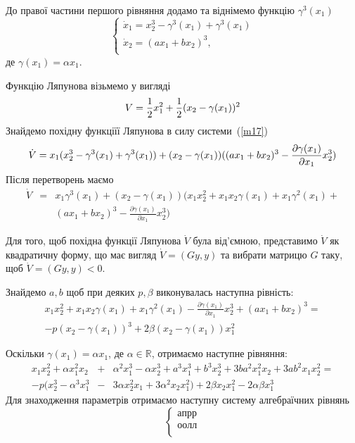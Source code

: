 \documentclass{article}
\begin{document}
До правої частини першого рівняння додамо та віднімемо функцію $\gamma^3(x_1)$ 
\begin{equation} \label{m17}
    \begin{cases}
    \dot x_1 =x_{2}^3 -\gamma^3(x_1)+\gamma^3(x_1) \\
    \dot x_2 = (ax_1+bx_2)^3,\\
    \end{cases}
\end{equation}
де $\gamma(x_1) = \alpha x_1$.

Функцію Ляпунова візьмемо у вигляді  
\begin{equation}
    V = \frac{1}{2}x_{1}^2 +\frac{1}{2}(x_2 - \gamma(x_1) )^2\\
\end{equation}
Знайдемо похідну функціїї Ляпунова в силу системи~(\ref{m17})
\begin{equation}
    \dot V = x_1(x_2^3 - \gamma^3(x_1)+\gamma^3(x_1)) + \\
    (x_2 - \gamma(x_1))( (ax_1+bx_2)^3-\frac{\partial \gamma(x_1)}{\partial x_1}x_2^3)
\end{equation}
Після перетворень маємо
\begin{eqnarray}
    \dot V&=& x_1\gamma^3(x_1)+(x_2 - \gamma(x_1))
   \Big (x_1x_2^2 + x_1x_2\gamma(x_1) + x_{1}\gamma^2(x_1) +\nonumber\\ 
    &&(ax_1+bx_2)^3 - \frac{\partial \gamma(x_1)}{\partial x_1}x_{2}^3\Big)
\end{eqnarray}

Для того, щоб похідна функції Ляпунова $\dot V$ була від'ємною, представимо
 $\dot V$ як квадратичну форму, що має вигляд $\dot V =(Gy,y)$ 
та вибрати матрицю $G$ таку, щоб  $\dot V =(Gy,y) < 0$.

Знайдемо $a,b$ щоб при деяких $p, \beta$ виконувалась наступна рівність:
\begin{eqnarray}
    x_1x_2^2+x_1x_2\gamma(x_1) + x_1 \gamma^2(x_1) - 
    \frac{\partial \gamma(x_1)}{\partial x_1}x_2^3 + (ax_1+bx_2)^3 = \nonumber\\
    -p(x_2-\gamma(x_1))^3 +2\beta(x_2-\gamma(x_1))x_{1}^2 
\end{eqnarray}

Оскільки $\gamma(x_1)=\alpha x_1$, де $\alpha \in \mathbb{R}$,
отримаємо наступне рівняння:
\begin{eqnarray}
x_1x_{2}^2 + \alpha x_{1}^2x_2 &+& \alpha^2x_{1}^3 -\alpha x_{2}^3 
+ a^3x_{1}^3 + b^3x_{2}^3 + 3ba^2x_{1}^2x_2+\nonumber
3ab^2x_1x_{2}^2 =\\
-p(x_2^3 - \alpha^{3}x_{1}^3 &-& 3\alpha x_2^2x_{1} + 3\alpha^2x_2x_{1}^2)+
2\beta x_2x_{1}^2 - 2\alpha \beta x_1^3
\end{eqnarray}
Для знаходження параметрів отримаємо наступну систему алгебраїчних рівнянь 
\begin{equation}
    \begin{cases}
        апрр\\
        оолл\\
    \end{cases}
\end{equation}
\end{document}
